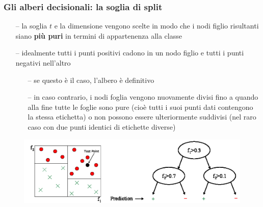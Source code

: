 \begin{frame}
	
	\frametitle{Gli alberi decisionali: la soglia di split}

	\begin{itemize}
		\item[--] la soglia $t$ e la dimensione vengono scelte in modo che i nodi figlio risultanti siano \textbf{più puri} in termini di appartenenza alla classe
		\item[--] idealmente tutti i punti positivi cadono in un nodo figlio e tutti i punti negativi nell'altro
			\begin{itemize}
				\item[--] se questo è il caso, l'albero è definitivo
				\item[--] in caso contrario, i nodi foglia vengono nuovamente divisi fino a quando alla fine tutte le foglie sono pure (cioè tutti i suoi punti dati contengono la stessa etichetta) o non possono essere ulteriormente suddivisi (nel raro caso con due punti identici di etichette diverse)
			\end{itemize}
	\end{itemize}
	
	\begin{figure}[!htbp]
		\centering
		\includegraphics[width=0.8\linewidth]{images/supervised/decision_trees/binary_decision_tree.png}
	\end{figure}

\end{frame}


